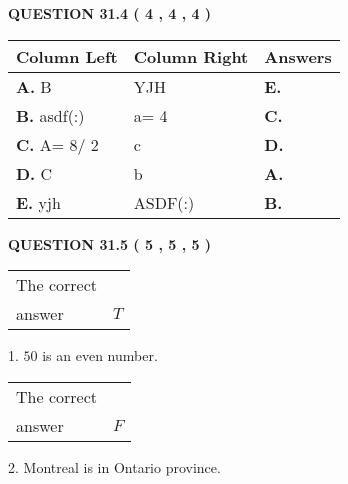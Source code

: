 \documentclass[12pt]{article}
\begin{document}
 
 
 
  
\vspace{0.2in}
  
{\textbf{\Large{QUESTION
31.4 
 (           4 ,           4 ,           4 )
}}}
  
  
 
 
\noindent{}
  
  
\begin{tabular}{|l|l|l|}
 \hline
 Column Left & Column Right  & Answers       \\ 
 \hline
{\textbf{\large{
A.}}}
B
  & 
YJH
 & 
{\textbf{\large{
E.}}}
 \\ 
 \hline
{\textbf{\large{
B.}}}
asdf(:)
  & 
 a= %
4
 & 
{\textbf{\large{
C.}}}
 \\ 
 \hline
{\textbf{\large{
C.}}}
 A= %
8/ %
2

  & 
c
 & 
{\textbf{\large{
D.}}}
 \\ 
 \hline
{\textbf{\large{
D.}}}
C
  & 
b
 & 
{\textbf{\large{
A.}}}
 \\ 
 \hline
{\textbf{\large{
E.}}}
yjh
  & 
ASDF(:)
 & 
{\textbf{\large{
B.}}}
 \\ 
 \hline
 \end{tabular}
  
  
 
 
 
 
  
\vspace{0.2in}
  
{\textbf{\Large{QUESTION
31.5 
 (           5 ,           5 ,           5 )
}}}
  
  
 
 
\noindent{}

 
\noindent\begin{tabular}{|l|l|}\hline The correct & \\
          answer &  %
$T$ \\ \hline \end{tabular}
1. $ %
50$ is an  %
even number.
 
\noindent\begin{tabular}{|l|l|}\hline The correct & \\
          answer &  %
$F$ \\ \hline \end{tabular}
2.  %
Montreal is in  %
Ontario province.
 
\end{document}
